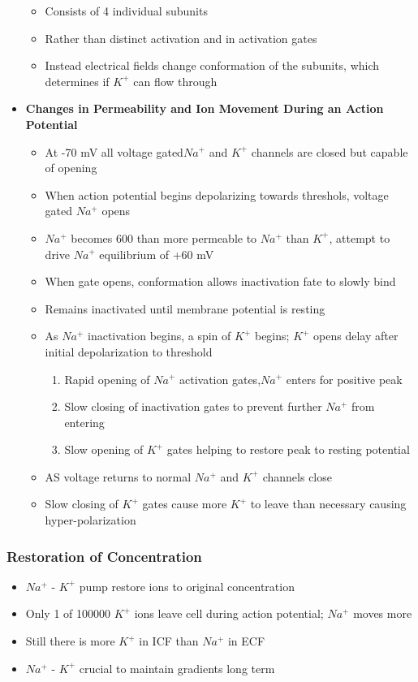 \documentclass[11pt]{article}
\begin{document}
\begin{itemize}
\begin{itemize}
\item Consists of 4 individual subunits
\item Rather than distinct activation and in activation gates 
\item Instead electrical fields change conformation of the subunits, which determines if $K^+$ can flow through
\end{itemize}
\item \textbf{Changes in Permeability and Ion Movement During an Action Potential}
\begin{itemize}
\item At -70 mV all voltage gated$Na^+$ and $K^+$ channels are closed but capable of opening 
\item When action potential begins depolarizing towards threshols, voltage gated $Na^+$ opens
\item $Na^+$ becomes 600 than more permeable to $Na^+$ than $K^+$, attempt to drive $Na^+$ equilibrium of +60 mV
\item When gate opens, conformation allows inactivation fate to slowly bind 
\item Remains inactivated until membrane potential is resting
\item As $Na^+$ inactivation begins, a spin of $K^+$ begins; $K^+$ opens delay after initial depolarization to threshold
\begin{enumerate}
\item Rapid opening of $Na^+$ activation gates,$Na^+$ enters for positive peak
\item Slow closing of inactivation gates to prevent further $Na^+$ from entering\item Slow opening of $K^+$ gates helping to restore peak to resting potential
\end{enumerate}
\item AS voltage returns to normal $Na^+$ and $K^+$ channels close 
\item Slow closing of  $K^+$ gates cause more $K^+$ to leave than necessary causing hyper-polarization 
\end{itemize}
\end{itemize}



\subsubsection{Restoration of Concentration}
\begin{itemize}
\item $Na^+$ - $K^+$ pump restore ions to original concentration
\item Only 1 of 100000 $K^+$ ions leave cell during action potential; $Na^+$ moves more
\item Still there is more $K^+$ in ICF than $Na^+$ in ECF
\item $Na^+$ - $K^+$ crucial to maintain gradients long term
\end{itemize}
\end{document}
